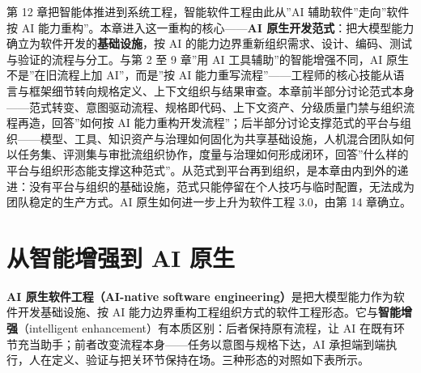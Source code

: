\documentclass[12pt,a4paper,twoside,openany]{ctexbook}
\numberwithin{figure}{chapter}
\numberwithin{table}{chapter}
\begin{document}
第 12 章把智能体推进到系统工程，智能软件工程由此从''AI
辅助软件''走向''软件按 AI
能力重构''。本章进入这一重构的核心------\textbf{AI
原生开发范式}：把大模型能力确立为软件开发的\textbf{基础设施}，按 AI
的能力边界重新组织需求、设计、编码、测试与验证的流程与分工。与第 2 至 9
章''用 AI 工具辅助''的智能增强不同，AI 原生不是''在旧流程上加
AI''，而是''按 AI
能力重写流程''------工程师的核心技能从语言与框架细节转向规格定义、上下文组织与结果审查。本章前半部分讨论范式本身------范式转变、意图驱动流程、规格即代码、上下文资产、分级质量门禁与组织流程再造，回答''如何按
AI
能力重构开发流程''；后半部分讨论支撑范式的平台与组织------模型、工具、知识资产与治理如何固化为共享基础设施，人机混合团队如何以任务集、评测集与审批流组织协作，度量与治理如何形成闭环，回答''什么样的平台与组织形态能支撑这种范式''。从范式到平台再到组织，是本章由内到外的递进：没有平台与组织的基础设施，范式只能停留在个人技巧与临时配置，无法成为团队稳定的生产方式。AI
原生如何进一步上升为软件工程 3.0，由第 14 章确立。

\section{从智能增强到 AI
原生}\label{ux4eceux667aux80fdux589eux5f3aux5230-ai-ux539fux751f}

\textbf{AI 原生软件工程（AI-native software
engineering）}是把大模型能力作为软件开发基础设施、按 AI
能力边界重构工程组织方式的软件工程形态。它与\textbf{智能增强}（intelligent
enhancement）有本质区别：后者保持原有流程，让 AI
在既有环节充当助手；前者改变流程本身------任务以意图与规格下达，AI
承担端到端执行，人在定义、验证与把关环节保持在场。三种形态的对照如下表所示。
\end{document}
